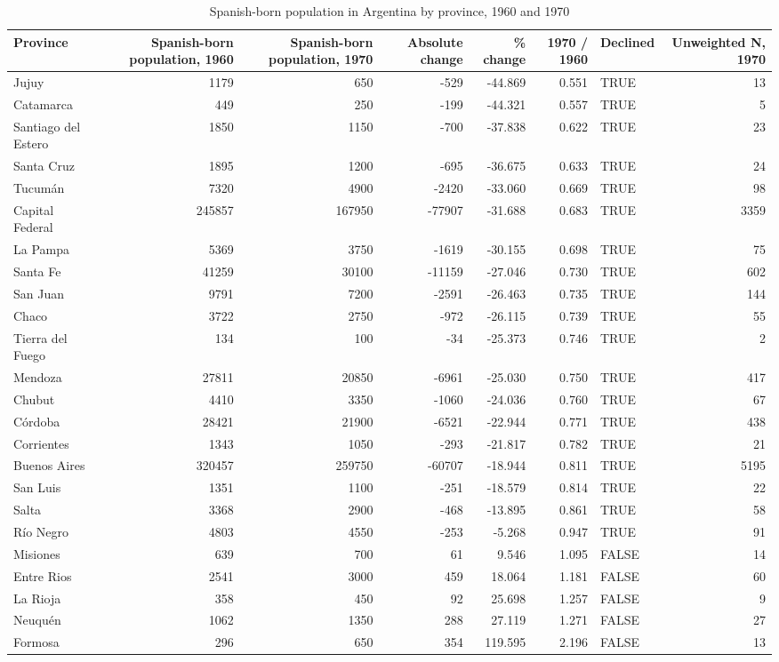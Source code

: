\begin{table}

\caption{Spanish-born population in Argentina by province, 1960 and 1970}
\centering
\begin{tabular}[t]{lrrrrrlr}
\toprule
Province & Spanish-born population, 1960 & Spanish-born population, 1970 & Absolute change & \% change & 1970 / 1960 & Declined & Unweighted N, 1970\\
\midrule
Jujuy & 1179 & 650 & -529 & -44.869 & 0.551 & TRUE & 13\\
Catamarca & 449 & 250 & -199 & -44.321 & 0.557 & TRUE & 5\\
Santiago del Estero & 1850 & 1150 & -700 & -37.838 & 0.622 & TRUE & 23\\
Santa Cruz & 1895 & 1200 & -695 & -36.675 & 0.633 & TRUE & 24\\
Tucumán & 7320 & 4900 & -2420 & -33.060 & 0.669 & TRUE & 98\\
\addlinespace
Capital Federal & 245857 & 167950 & -77907 & -31.688 & 0.683 & TRUE & 3359\\
La Pampa & 5369 & 3750 & -1619 & -30.155 & 0.698 & TRUE & 75\\
Santa Fe & 41259 & 30100 & -11159 & -27.046 & 0.730 & TRUE & 602\\
San Juan & 9791 & 7200 & -2591 & -26.463 & 0.735 & TRUE & 144\\
Chaco & 3722 & 2750 & -972 & -26.115 & 0.739 & TRUE & 55\\
\addlinespace
Tierra del Fuego & 134 & 100 & -34 & -25.373 & 0.746 & TRUE & 2\\
Mendoza & 27811 & 20850 & -6961 & -25.030 & 0.750 & TRUE & 417\\
Chubut & 4410 & 3350 & -1060 & -24.036 & 0.760 & TRUE & 67\\
Córdoba & 28421 & 21900 & -6521 & -22.944 & 0.771 & TRUE & 438\\
Corrientes & 1343 & 1050 & -293 & -21.817 & 0.782 & TRUE & 21\\
\addlinespace
Buenos Aires & 320457 & 259750 & -60707 & -18.944 & 0.811 & TRUE & 5195\\
San Luis & 1351 & 1100 & -251 & -18.579 & 0.814 & TRUE & 22\\
Salta & 3368 & 2900 & -468 & -13.895 & 0.861 & TRUE & 58\\
Río Negro & 4803 & 4550 & -253 & -5.268 & 0.947 & TRUE & 91\\
Misiones & 639 & 700 & 61 & 9.546 & 1.095 & FALSE & 14\\
\addlinespace
Entre Rios & 2541 & 3000 & 459 & 18.064 & 1.181 & FALSE & 60\\
La Rioja & 358 & 450 & 92 & 25.698 & 1.257 & FALSE & 9\\
Neuquén & 1062 & 1350 & 288 & 27.119 & 1.271 & FALSE & 27\\
Formosa & 296 & 650 & 354 & 119.595 & 2.196 & FALSE & 13\\
\bottomrule
\end{tabular}
\end{table}
